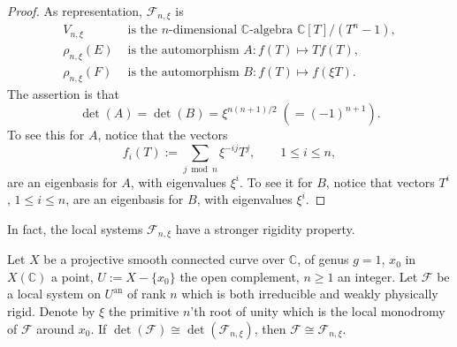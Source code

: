\begin{proof}
As representation, \(\mathcal{F}_{n,\xi}\) is
\[
  \begin{aligned}
  V_{n,\xi}&\text{ is the }n\text{-dimensional }\mathbb{C}\text{-algebra }
  \mathbb{C}[T]/(T^n-1),\\
  \rho_{n,\xi}(E)&\text{ is the automorphism }A:f(T)\mapsto Tf(T),\\
  \rho_{n,\xi}(F)&\text{ is the automorphism }B:f(T)\mapsto f(\xi T).
  \end{aligned}
\]
The assertion is that
\[
  \det(A)=\det(B)=\xi^{n(n+1)/2}\;(=(-1)^{n+1}).
\]
To see this for \(A\), notice that the vectors
\[
  f_i(T):=\sum_{j\bmod n}\xi^{-ij}T^j,\qquad 1\leq i\leq n,
\]
are an eigenbasis for \(A\), with eigenvalues \(\xi^i\). To see it for \(B\),
notice that vectors \(T^i\), \(1\leq i\leq n\), are an eigenbasis for \(B\),
with eigenvalues \(\xi^i\).
\end{proof}

In fact, the local systems \(\mathcal{F}_{n,\xi}\) have a stronger rigidity
property.

\setcounter{theorem}{8}
\begin{proposition}
\label{prop:1.4.9}
Let \(X\) be a projective smooth connected curve over \(\mathbb{C}\), of genus
\(g=1\), \(x_0\) in \(X(\mathbb{C})\) a point, \(U:=X-\{x_0\}\) the open
complement, \(n\geq 1\) an integer. Let \(\mathcal{F}\) be a local system on
\(U^{\mathrm{an}}\) of rank \(n\) which is both irreducible and weakly
physically rigid. Denote by \(\xi\) the primitive \(n\)'th root of unity which
is the local monodromy of \(\mathcal{F}\) around \(x_0\). If
\(\det(\mathcal{F})\cong\det(\mathcal{F}_{n,\xi})\), then
\(\mathcal{F}\cong\mathcal{F}_{n,\xi}\).
\end{proposition}


